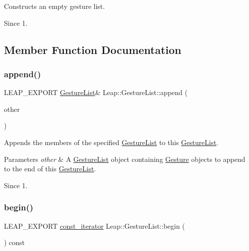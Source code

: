 Constructs an empty gesture list. \begin{DoxySince}{Since}
1. 
\end{DoxySince}


\subsection{Member Function Documentation}
\mbox{\label{class_leap_1_1_gesture_list_a377880f99549807dc965087ca14e34f1}} 
\subsubsection{\texorpdfstring{append()}{append()}}
{\footnotesize\ttfamily L\+E\+A\+P\+\_\+\+E\+X\+P\+O\+RT \hyperlink{class_leap_1_1_gesture_list}{Gesture\+List}\& Leap\+::\+Gesture\+List\+::append (\begin{DoxyParamCaption}\item[{const \hyperlink{class_leap_1_1_gesture_list}{Gesture\+List} \&}]{other }\end{DoxyParamCaption})}

Appends the members of the specified \hyperlink{class_leap_1_1_gesture_list}{Gesture\+List} to this \hyperlink{class_leap_1_1_gesture_list}{Gesture\+List}. 
\begin{DoxyParams}{Parameters}
{\em other} & A \hyperlink{class_leap_1_1_gesture_list}{Gesture\+List} object containing \hyperlink{class_leap_1_1_gesture}{Gesture} objects to append to the end of this \hyperlink{class_leap_1_1_gesture_list}{Gesture\+List}. \\
\hline
\end{DoxyParams}
\begin{DoxySince}{Since}
1. 
\end{DoxySince}
\mbox{\label{class_leap_1_1_gesture_list_a32a392c5f85fc781181307d89d42ac03}} 
\subsubsection{\texorpdfstring{begin()}{begin()}}
{\footnotesize\ttfamily L\+E\+A\+P\+\_\+\+E\+X\+P\+O\+RT \hyperlink{class_leap_1_1_gesture_list_aaf2fd030e686892a0da42d81fc0cad88}{const\+\_\+iterator} Leap\+::\+Gesture\+List\+::begin (\begin{DoxyParamCaption}{ }\end{DoxyParamCaption}) const}

